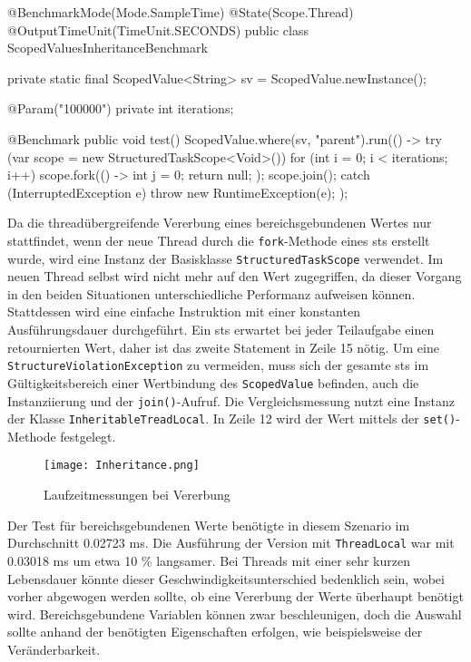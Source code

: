     \begin{program} [H]
        \caption{Laufzeit bei Vererbung}
        \label{prog:Inheritance}
    \begin{JavaCode}[language=Java, numbers=left]
@BenchmarkMode(Mode.SampleTime)
@State(Scope.Thread)
@OutputTimeUnit(TimeUnit.SECONDS)
public class ScopedValuesInheritanceBenchmark {
    private static final ScopedValue<String> sv = ScopedValue.newInstance();

    @Param({"100000"})
    private int iterations;

    @Benchmark
    public void test(){
        ScopedValue.where(sv, "parent").run(() -> {
            try (var scope = new StructuredTaskScope<Void>()) {
                for (int i = 0; i < iterations; i++) 
                    scope.fork(() -> {int j = 0; return null; });
                scope.join();
            } catch (InterruptedException e) {
                throw new RuntimeException(e);
            }
        });
    }
}\end{JavaCode}
    \end{program}
    Da die threadübergreifende Vererbung eines bereichsgebundenen Wertes nur stattfindet, wenn der neue Thread durch die \texttt{fork}-Methode eines \gls{sts} erstellt wurde, wird eine Instanz 
    der Basisklasse \texttt{StructuredTaskScope} verwendet. Im neuen Thread selbst wird nicht mehr auf
    den Wert zugegriffen, da dieser Vorgang in den beiden Situationen unterschiedliche Performanz aufweisen können. Stattdessen wird eine einfache Instruktion mit einer konstanten Ausführungsdauer
    durchgeführt. Ein \gls{sts} erwartet bei jeder Teilaufgabe einen retournierten Wert, daher ist das zweite Statement in Zeile 15 nötig. Um eine \texttt{StructureViolationException} zu vermeiden,
    muss sich der gesamte \gls{sts} im Gültigkeitsbereich einer Wertbindung des \texttt{ScopedValue} befinden, auch die Instanziierung und der \texttt{join()}-Aufruf. Die Vergleichsmessung
    nutzt eine Instanz der Klasse \texttt{InheritableTreadLocal}. In Zeile 12 wird der Wert mittels der \texttt{set()}-Methode festgelegt.

    \begin{figure}[H]
        \centering
        \texttt{[image: Inheritance.png]}
        \caption{Laufzeitmessungen bei Vererbung}
        \label{fig:inheritance}
    \end{figure}

    Der Test für bereichsgebundenen Werte benötigte in diesem Szenario im Durchschnitt 0.02723 ms. Die Ausführung der Version mit \texttt{ThreadLocal} war mit 0.03018 ms um etwa 10 \% langsamer. 
    Bei Threads mit einer sehr kurzen Lebensdauer könnte dieser Geschwindigkeitsunterschied bedenklich sein, wobei vorher abgewogen werden sollte, ob eine Vererbung der Werte überhaupt 
    benötigt wird. Bereichsgebundene Variablen können zwar beschleunigen, doch die Auswahl sollte anhand der benötigten Eigenschaften erfolgen, wie beispielsweise der Veränderbarkeit.


